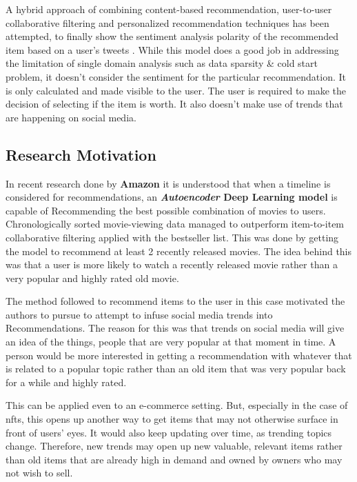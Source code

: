 \documentclass[manuscript,natbib=false, anonymous]{acmart}
\begin{document}
A hybrid approach of combining content-based recommendation, user-to-user collaborative filtering and personalized recommendation techniques has been attempted, to finally show the sentiment analysis polarity of the recommended item based on a user's tweets \cite{ayushiCrossDomainRecommendationModel2018}. While this model does a good job in addressing the limitation of single domain analysis such as data sparsity \& cold start problem, it doesn't consider the sentiment for the particular recommendation. It is only calculated and made visible to the user. The user is required to make the decision of selecting if the item is worth. It also doesn't make use of trends that are happening on social media.

\subsection{Research Motivation}
In recent research done by \textbf{Amazon} \cite{larryHistoryAmazonRecommendation2019} it is understood that when a timeline is considered for recommendations, an \textbf{\emph{Autoencoder} Deep Learning model} is capable of Recommending the best possible combination of movies to users. Chronologically sorted movie-viewing data managed to outperform item-to-item collaborative filtering applied with the bestseller list.
This was done by getting the model to recommend at least 2 recently released movies. The idea behind this was that a user is more likely to watch a recently released movie rather than a very popular and highly rated old movie.

The method followed to recommend items to the user in this case motivated the authors to pursue to attempt to infuse social media trends into Recommendations. The reason for this was that trends on social media will give an idea of the things, people that are very popular at that moment in time. A person would be more interested in getting a recommendation with whatever that is related to a popular topic rather than an old item that was very popular back for a while and highly rated.

This can be applied even to an e-commerce setting. But, especially in the case of \gls{nft}s, this opens up another way to get items that may not otherwise surface in front of users' eyes. It would also keep updating over time, as trending topics change.
Therefore, new trends may open up new valuable, relevant items rather than old items that are already high in demand and owned by owners who may not wish to sell.
\end{document}
